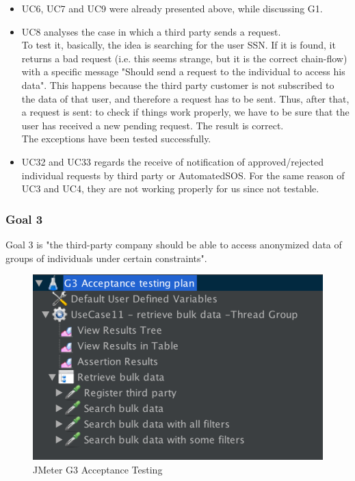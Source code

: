 \begin{itemize}
\item UC6, UC7 and UC9 were already presented above, while discussing G1.

\item UC8 analyses the case in which a third party sends a request. \\
To test it, basically, the idea is searching for the user SSN. 
If it is found, it returns a bad request (i.e. this seems strange, but it is the correct chain-flow) with a specific message "Should send a
request to the individual to access his data". This happens because the third party customer is not subscribed to the data of that user, and
therefore a request has to be sent.
Thus, after that, a request is sent: to check if things work properly, we have to be sure that the user has received a new pending request. 
The result is correct.  \\
The exceptions have been tested successfully. 

\item UC32 and UC33 regards the receive of notification of approved/rejected individual requests by third party or AutomatedSOS. For the same reason of UC3 and UC4, they are not working properly for us since not testable.

\end{itemize}

\subsubsection{Goal 3}
Goal 3 is "the third-party company should be able to access anonymized data of groups
of individuals under certain constraints".

\begin{figure}[H]
\includegraphics[width=0.7\linewidth]{images/goal3}
\centering
\caption{ JMeter G3 Acceptance Testing }
\label{fig:goal3}
\end{figure}

